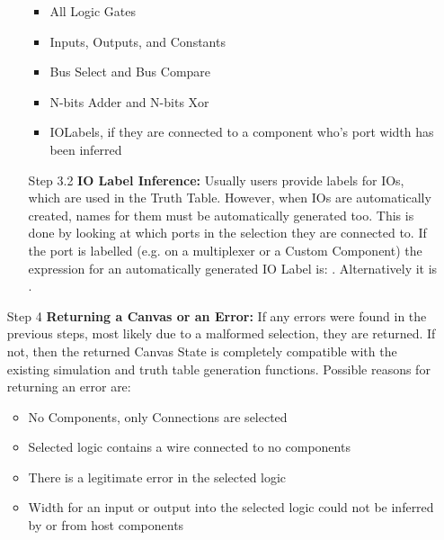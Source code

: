 \begin{itemize}
\begin{itemize}
        \begin{itemize}
            \item All Logic Gates
            \item Inputs, Outputs, and Constants
            \item Bus Select and Bus Compare
            \item N-bits Adder and N-bits Xor
            \item IOLabels, if they are connected to a component who's port width has been inferred
        \end{itemize}
        \item[Step 3.2] \textbf{IO Label Inference:} Usually users provide labels for IOs, which are used in the Truth Table. However, when IOs are automatically created, names for them must be automatically generated too. This is done by looking at which ports in the selection they are connected to. If the port is labelled (e.g. on a multiplexer or a Custom Component) the expression for an automatically generated IO Label is: . Alternatively it is .
    \end{itemize} 
    \item[Step 4] \textbf{Returning a Canvas or an Error:} If any errors were found in the previous steps, most likely due to a malformed selection, they are returned. If not, then the returned Canvas State is completely compatible with the existing simulation and truth table generation functions. Possible reasons for returning an error are:
    \begin{itemize}
        \item No Components, only Connections are selected
        \item Selected logic contains a wire connected to no components
        \item There is a legitimate error in the selected logic
        \item Width for an input or output into the selected logic could not be inferred by  or from host components
    \end{itemize}
\end{itemize}

